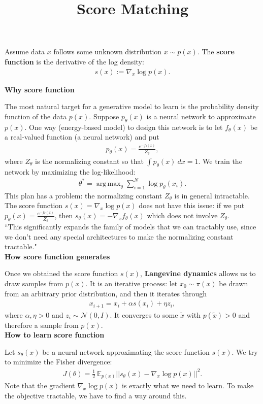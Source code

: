 \documentclass[12pt,oneside]{article}
\title{Score Matching}
\date{} %
\newcommand{\norm}[1]{\left|\left|#1\right|\right|}
\newcommand{\CN}[0]{\mathcal{N}}
\newcommand{\BE}[0]{\mathbb{E}}
\newcommand{\ali}[1]{\begin{align*}#1\end{align*}}
\DeclareMathOperator*{\argmax}{arg\,max}
\theoremstyle{plain}
\theoremstyle{remark}
\begin{document}
\onehalfspace
\sloppy
\maketitle

Assume data $x$ follows some unknown distribution $x \sim p(x)$. The {\bf score function} is the derivative of the log density:
\ali{s(x) := \nabla_x \log p(x).}

{\bf Why score function\\}

The most natural target for a generative model to learn is the probability density function of the data $p(x)$. Suppose $p_\theta(x)$ is a neural network to approximate $p(x)$. One way (energy-based model) to design this network is to let $f_\theta(x)$ be a real-valued function (a neural network) and put 
\ali{p_\theta(x) = \frac{e^{-f_\theta(x)}}{Z_\theta},}
where $Z_\theta$ is the normalizing constant so that $\int p_\theta(x) \ dx = 1$. We train the network by maximizing the log-likelihood:
\ali{\theta^* = \argmax_{\theta} \sum_{i=1}^N \log p_\theta(x_i).} 
This plan has a problem: the normalizing constant $Z_\theta$ is in general intractable. The score function $s(x) = \nabla_x \log p(x)$ does not have this issue: if we put $p_\theta(x) = \frac{e^{-f_\theta(x)}}{Z_\theta}$, then $s_\theta(x) = - \nabla_x f_\theta(x)$ which does not involve $Z_\theta$.\\
``This significantly expands the family of models that we can tractably use, since we don't need any special architectures to make the normalizing constant tractable."\\

{\bf How score function generates\\}

Once we obtained the score function $s(x)$, {\bf Langevine dynamics} allows us to draw samples from $p(x)$. It is an iterative process: let $x_0 \sim \pi(x)$ be drawn from an arbitrary prior distribution, and then it iterates through
\ali{x_{i+1} = x_i + \alpha s(x_i) + \eta z_i,}
where $\alpha, \eta > 0$ and $z_i \sim \CN(0, I)$. It converges to some $\tilde{x}$ with $p(\tilde{x}) > 0$ and therefore a sample from $p(x)$.\\

{\bf How to learn score function\\} 

Let $s_\theta(x)$ be a neural network approximating the score function $s(x)$. We try to minimize the Fisher divergence:
\ali{J(\theta) = \frac{1}{2} \ \BE_{p(x)}  \norm{s_\theta(x) - \nabla_x \log p(x)}^2.}
Note that the gradient $\nabla_x \log p(x)$ is exactly what we need to learn. To make the objective tractable, we have to find a way around this.\\
\end{document}
